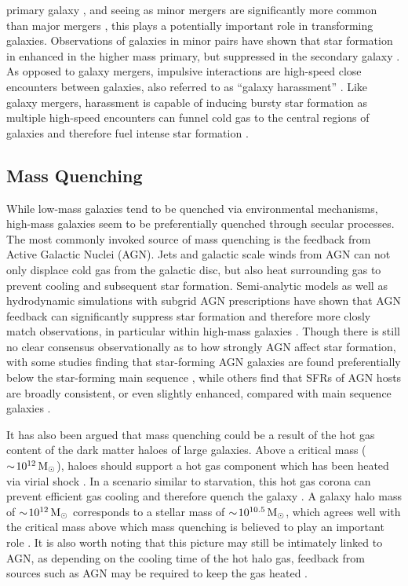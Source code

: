 primary galaxy \citep[e.g.][]{mihos1994a}, and seeing as minor mergers
are significantly more common than major mergers \citep{lotz2011},
this plays a potentially important role in transforming galaxies.
Observations of galaxies in minor pairs have shown that star formation
in enhanced in the higher mass primary, but suppressed in the
secondary galaxy \citep{davies2015}.  As opposed to galaxy mergers,
impulsive interactions are high-speed close encounters between
galaxies, also referred to as ``galaxy harassment'' \citep{moore1996}.
Like galaxy mergers, harassment is capable of inducing bursty star
formation as multiple high-speed encounters can funnel cold gas to the
central regions of galaxies and therefore fuel intense star formation
\citep{fujita1998}.  

\subsection{Mass Quenching}
\label{mass_quench}

While low-mass galaxies tend to be quenched via environmental
mechanisms, high-mass galaxies seem to be preferentially quenched
through secular processes.  The most commonly invoked source of mass
quenching is the feedback from Active Galactic Nuclei (AGN).  Jets and
galactic scale winds from AGN can not only displace cold gas from the
galactic disc, but also heat surrounding gas to prevent cooling and
subsequent star formation.  Semi-analytic models as well as
hydrodynamic simulations with subgrid AGN prescriptions have shown
that AGN feedback can significantly suppress star formation and
therefore more closly match observations, in
particular within high-mass galaxies \citep[e.g.][]{somerville2008,
  dubois2013, bongiorno2016}.  Though there is still no clear
consensus observationally as to how strongly AGN affect star
formation, with some studies finding that star-forming AGN galaxies
are found preferentially below the star-forming main sequence
\citep{gurkan2015, mullaney2015, ellison2016}, while
others find that SFRs of AGN hosts are broadly consistent, or even
slightly enhanced, compared with main sequence galaxies
\citep{santini2012, lanzuisi2015, stanley2015}.
\par
It has also been argued that mass quenching could be a result of the
hot gas content of the dark matter haloes of large galaxies.  Above a
critical mass ($\sim\!10^{12}\,\mathrm{M_{\odot}}$), haloes should support a hot gas
component which has been heated via virial shock \citep{birnboim2003}.  In a
scenario similar to starvation, this hot gas corona can prevent
efficient gas cooling and therefore quench the galaxy
\citep{cattaneo2006, gabor2015}.
A galaxy halo mass of $\sim\!10^{12}\,\mathrm{M_{\odot}}$ corresponds to a stellar
mass of $\sim\!10^{10.5}\,\mathrm{M_{\odot}}$, which agrees well with the critical
mass above which mass quenching is believed to play an important role
\citep{peng2010}.  It is also worth noting that this picture may still
be intimately linked to AGN, as depending on the cooling time of the
hot halo gas, feedback from sources such as AGN may be required to
keep the gas heated \citep{cattaneo2006}.

